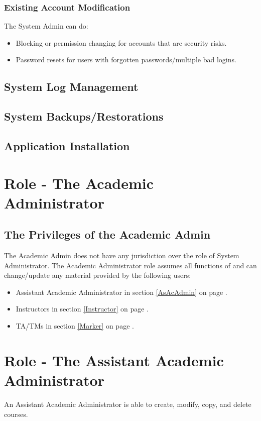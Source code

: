 \documentclass{article}
\begin{document}
\subsubsection{Existing Account Modification}
The System Admin can do:
\begin{itemize}
  \item Blocking or permission changing for accounts that are security risks.
  \item Password resets for users with forgotten passwords/multiple bad logins.
\end{itemize}
\subsection{System Log Management}
\subsection{System Backups/Restorations}
\subsection{Application Installation}

\section{Role - The Academic Administrator \label{AcAdmin}}
\subsection{The Privileges of the Academic Admin}
The Academic Admin does not have any jurisdiction over the role of System Administrator.
The Academic Administrator role assumes all functions of and can change/update any material
provided by the following users:
\begin{itemize}
  \item Assistant Academic Administrator in section \ref{AsAcAdmin} on page \pageref{AsAcAdmin}.
  \item Instructors  in section \ref{Instructor} on page \pageref{Instructor}.
  \item TA/TMs in section \ref{Marker} on page \pageref{Marker}.
\end{itemize}

\section{Role - The Assistant Academic Administrator \label{AsAcAdmin}}
An Assistant Academic Administrator is able to create, modify, copy, and delete courses.
\end{document}
